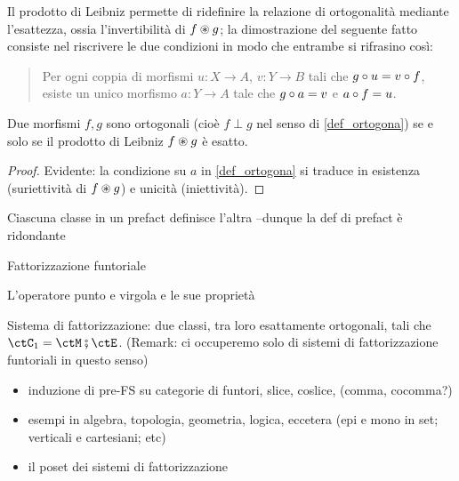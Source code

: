 Il prodotto di Leibniz permette di ridefinire la relazione di ortogonalità mediante l'esattezza, ossia l'invertibilità di \(f\oast g\); la dimostrazione del seguente fatto consiste nel riscrivere le due condizioni in modo che entrambe si rifrasino così:
\begin{quote}
	Per ogni coppia di morfismi \(u : X\to A\), \(v : Y\to B\) tali che \(g\circ u=v\circ f\), esiste un unico morfismo \(a : Y\to A\) tale che \(g\circ a=v\) e \(a\circ f=u\).
\end{quote}
\begin{proposition}
	Due morfismi \(f,g\) sono ortogonali (cioè \(f\perp g\) nel senso di \ref{def_ortogona}) se e solo se il prodotto di Leibniz \(f\oast g\) è esatto.
\end{proposition}
\begin{proof}
	Evidente: la condizione su \(a\) in \ref{def_ortogona} si traduce in esistenza (suriettività di \(f\oast g\)) e unicità (iniettività).
\end{proof}
\begin{definition}
	\Todo{}
\end{definition}
\begin{proposition}
	Ciascuna classe in un prefact definisce l'altra --dunque la def di prefact è ridondante
\end{proposition}
\begin{definition}\label{fat_funno}
	Fattorizzazione funtoriale
\end{definition}
\begin{definition}
	L'operatore punto e virgola e le sue proprietà
\end{definition}
\begin{definition}
	Sistema di fattorizzazione: due classi, tra loro esattamente ortogonali, tali che \(\ctC_1 = \ctM \fatsemi \ctE\).
	(Remark: ci occuperemo solo di sistemi di fattorizzazione funtoriali in questo senso)
\end{definition}
\begin{itemize}
	\item induzione di pre-FS su categorie di funtori, slice, coslice, (comma, cocomma?)
	\item esempi in algebra, topologia, geometria, logica, eccetera (epi e mono in set; verticali e cartesiani; etc)
	\item il poset dei sistemi di fattorizzazione
\end{itemize}
